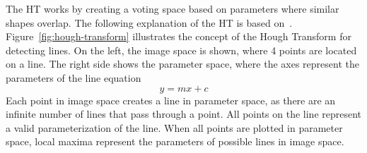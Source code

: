 The HT works by creating a voting space based on parameters where similar shapes overlap\cite{kaiser_survey_2019}.
The following explanation of the HT is based on~\cite{shree_k_nayar_first_2021}.
Figure~\ref{fig:hough-transform} illustrates the concept of the Hough Transform for detecting lines.
On the left, the image space is shown, where 4 points are located on a line.
The right side shows the parameter space, where the axes represent the parameters of the line equation
\begin{equation}
    y = mx + c
\end{equation}
Each point in image space creates a line in parameter space, as there are an infinite number of lines that pass through a point.
All points on the line represent a valid parameterization of the line.
When all points are plotted in parameter space, local maxima represent the parameters of possible lines in image space.
